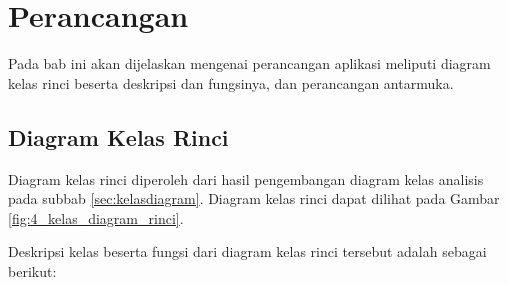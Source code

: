 \chapter{Perancangan}
\label{chap:perancangan}

Pada bab ini akan dijelaskan mengenai perancangan aplikasi meliputi diagram kelas rinci beserta deskripsi dan fungsinya, dan perancangan antarmuka.

\section{Diagram Kelas Rinci} 
\label{sec:kelasdiagramrinci}
Diagram kelas rinci diperoleh dari hasil pengembangan diagram kelas analisis pada subbab \ref{sec:kelasdiagram}. Diagram kelas rinci dapat dilihat pada Gambar \ref{fig:4_kelas_diagram_rinci}. 

Deskripsi kelas beserta fungsi dari diagram kelas rinci tersebut adalah sebagai berikut:


